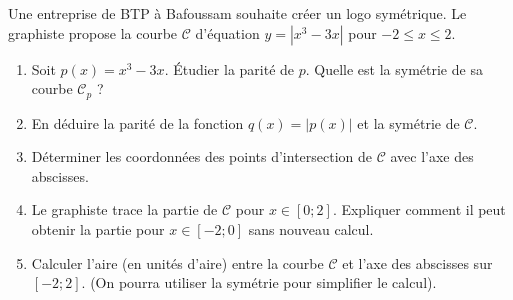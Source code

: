 \documentclass[11pt]{article}
\begin{document}
\begin{exercice}
\label{exo:logo}
Une entreprise de BTP à Bafoussam souhaite créer un logo symétrique. Le graphiste propose la courbe $\mathcal{C}$ d'équation $y = |x^3 - 3x|$ pour $-2 \le x \le 2$.
\begin{enumerate}
    \item Soit $p(x) = x^3 - 3x$. Étudier la parité de $p$. Quelle est la symétrie de sa courbe $\mathcal{C}_p$ ?
    \item En déduire la parité de la fonction $q(x) = |p(x)|$ et la symétrie de $\mathcal{C}$.
    \item Déterminer les coordonnées des points d'intersection de $\mathcal{C}$ avec l'axe des abscisses.
    \item Le graphiste trace la partie de $\mathcal{C}$ pour $x \in [0; 2]$. Expliquer comment il peut obtenir la partie pour $x \in [-2; 0]$ sans nouveau calcul.
    \item Calculer l'aire (en unités d'aire) entre la courbe $\mathcal{C}$ et l'axe des abscisses sur $[-2; 2]$. (On pourra utiliser la symétrie pour simplifier le calcul).
\end{enumerate}
\end{exercice}
\end{document}
